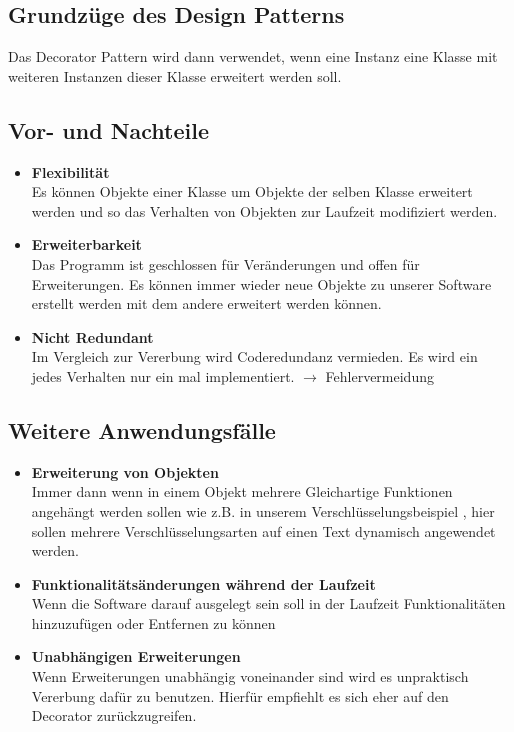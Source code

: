 	\subsection{Grundzüge des Design Patterns}
Das Decorator Pattern wird dann verwendet, wenn eine Instanz eine Klasse mit weiteren Instanzen dieser Klasse erweitert werden soll.
	\subsection{Vor- und Nachteile}
\begin{itemize}
	\item \textbf{Flexibilität} \\ 
 Es können Objekte einer Klasse um Objekte der selben Klasse erweitert werden und so das Verhalten von Objekten zur Laufzeit modifiziert werden.
	 \item \textbf{Erweiterbarkeit}\\
 Das Programm ist geschlossen für Veränderungen und offen für Erweiterungen. Es können immer wieder neue Objekte zu unserer Software erstellt werden mit dem andere erweitert werden können.
	 \item \textbf{Nicht Redundant}\\
 Im Vergleich zur Vererbung wird Coderedundanz vermieden. Es wird ein jedes Verhalten nur ein mal implementiert. $\rightarrow$ Fehlervermeidung
\end{itemize}

	\subsection{Weitere Anwendungsfälle}
\begin{itemize}
	\item \textbf{Erweiterung von Objekten}\\
	Immer dann wenn in einem Objekt mehrere Gleichartige Funktionen angehängt werden sollen wie z.B. in unserem Verschlüsselungsbeispiel , hier sollen mehrere Verschlüsselungsarten auf einen Text dynamisch angewendet werden.
	\item \textbf{Funktionalitätsänderungen während der Laufzeit}\\
	Wenn die Software darauf ausgelegt sein soll in der Laufzeit Funktionalitäten hinzuzufügen oder Entfernen zu können
	\item \textbf{Unabhängigen Erweiterungen}\\
	Wenn Erweiterungen unabhängig voneinander sind wird es unpraktisch Vererbung dafür zu benutzen. Hierfür empfiehlt es sich eher auf den Decorator zurückzugreifen.
	
\end{itemize}

